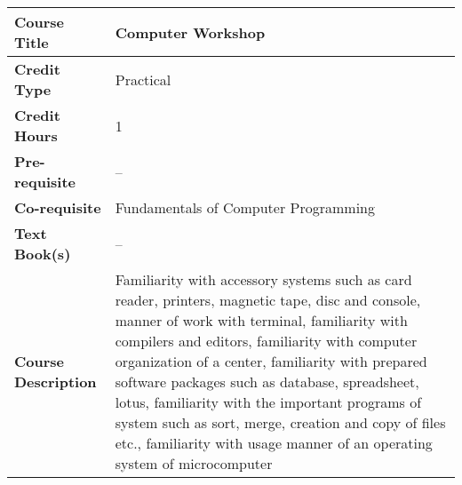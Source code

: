 \documentclass[11pt]{article}
\begin{document}
\begin{table}[h!]
\begin{tabular}{|l|l|}
\hline
\textbf{Course Title}       &  Computer Workshop \\ \hline
\textbf{Credit Type}        &   Practical \\ \hline
\textbf{Credit Hours}       &  1 \\ \hline
\textbf{Pre-requisite}       &   -- \\ \hline
\textbf{Co-requisite}       &   Fundamentals of Computer Programming\\ \hline
\textbf{Text Book(s)}       & -- \\ \hline
\textbf{Course Description} & \begin{minipage}{.70\textwidth}
\vspace{3mm}
Familiarity with accessory systems such as card reader, printers, magnetic tape, disc and console,
manner of work with terminal, familiarity with compilers and editors,
familiarity with computer organization of a center, familiarity with prepared software packages such as
database, spreadsheet, lotus, familiarity with the important programs of system such as sort, merge,
creation and copy of files etc., familiarity with usage manner of an operating system of microcomputer
\vspace{3mm}
\end{minipage} \\ \hline
\end{tabular}
\end{table}
\end{document}
